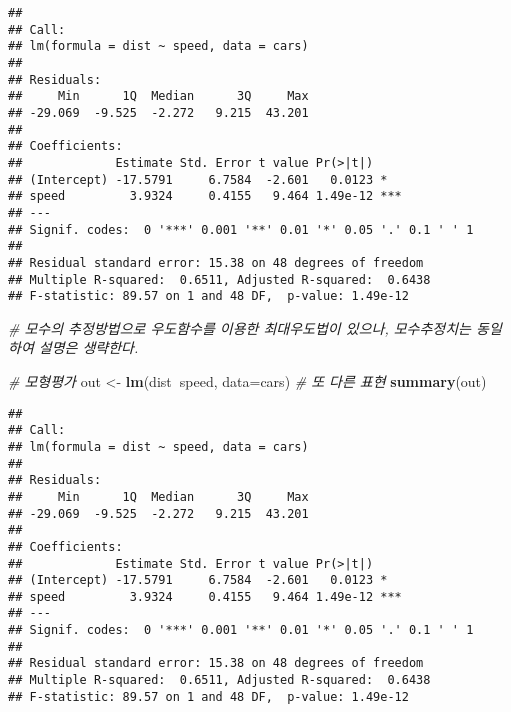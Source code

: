\documentclass[]{article}
\newenvironment{Shaded}{\begin{snugshade}}{\end{snugshade}}
\newcommand{\KeywordTok}[1]{\textcolor[rgb]{0.13,0.29,0.53}{\textbf{#1}}}
\newcommand{\DataTypeTok}[1]{\textcolor[rgb]{0.13,0.29,0.53}{#1}}
\newcommand{\FloatTok}[1]{\textcolor[rgb]{0.00,0.00,0.81}{#1}}
\newcommand{\StringTok}[1]{\textcolor[rgb]{0.31,0.60,0.02}{#1}}
\newcommand{\CommentTok}[1]{\textcolor[rgb]{0.56,0.35,0.01}{\textit{#1}}}
\newcommand{\OperatorTok}[1]{\textcolor[rgb]{0.81,0.36,0.00}{\textbf{#1}}}
\newcommand{\NormalTok}[1]{#1}
\begin{document}
\begin{verbatim}
## 
## Call:
## lm(formula = dist ~ speed, data = cars)
## 
## Residuals:
##     Min      1Q  Median      3Q     Max 
## -29.069  -9.525  -2.272   9.215  43.201 
## 
## Coefficients:
##             Estimate Std. Error t value Pr(>|t|)    
## (Intercept) -17.5791     6.7584  -2.601   0.0123 *  
## speed         3.9324     0.4155   9.464 1.49e-12 ***
## ---
## Signif. codes:  0 '***' 0.001 '**' 0.01 '*' 0.05 '.' 0.1 ' ' 1
## 
## Residual standard error: 15.38 on 48 degrees of freedom
## Multiple R-squared:  0.6511, Adjusted R-squared:  0.6438 
## F-statistic: 89.57 on 1 and 48 DF,  p-value: 1.49e-12
\end{verbatim}

\begin{Shaded}
\begin{Highlighting}[]
\CommentTok{# 모수의 추정방법으로 우도함수를 이용한 최대우도법이 있으나, 모수추정치는 동일하여 설명은 생략한다.}

\CommentTok{# 모형평가}
\NormalTok{out <-}\StringTok{ }\KeywordTok{lm}\NormalTok{(dist}\OperatorTok{~}\NormalTok{speed, }\DataTypeTok{data=}\NormalTok{cars) }\CommentTok{# 또 다른 표현 }
\KeywordTok{summary}\NormalTok{(out)}
\end{Highlighting}
\end{Shaded}

\begin{verbatim}
## 
## Call:
## lm(formula = dist ~ speed, data = cars)
## 
## Residuals:
##     Min      1Q  Median      3Q     Max 
## -29.069  -9.525  -2.272   9.215  43.201 
## 
## Coefficients:
##             Estimate Std. Error t value Pr(>|t|)    
## (Intercept) -17.5791     6.7584  -2.601   0.0123 *  
## speed         3.9324     0.4155   9.464 1.49e-12 ***
## ---
## Signif. codes:  0 '***' 0.001 '**' 0.01 '*' 0.05 '.' 0.1 ' ' 1
## 
## Residual standard error: 15.38 on 48 degrees of freedom
## Multiple R-squared:  0.6511, Adjusted R-squared:  0.6438 
## F-statistic: 89.57 on 1 and 48 DF,  p-value: 1.49e-12
\end{verbatim}

\begin{Shaded}
\end{Shaded}
\end{document}
